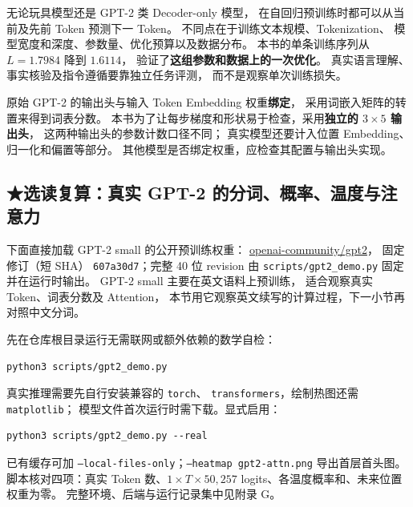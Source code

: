 无论玩具模型还是 GPT-2 类 Decoder-only 模型，
在自回归预训练时都可以从当前及先前 Token 预测下一 Token。
不同点在于训练文本规模、Tokenization、
模型宽度和深度、参数量、优化预算以及数据分布。
本书的单条训练序列从 $L=1.7984$ 降到 $1.6114$，
验证了\textbf{这组参数和数据上的一次优化}。
真实语言理解、事实核验及指令遵循要靠独立任务评测，
而不是观察单次训练损失。

原始 GPT-2 的输出头与输入 Token Embedding 权重\textbf{绑定}，
采用词嵌入矩阵的转置来得到词表分数。
本书为了让每步梯度和形状易于检查，采用\textbf{独立的 $3\times5$ 输出头}，
这两种输出头的参数计数口径不同；
真实模型还要计入位置 Embedding、归一化和偏置等部分。
其他模型是否绑定权重，应检查其配置与输出头实现。

\subsection{\texorpdfstring{{\symboliconfont ★}}{★}选读复算：真实 GPT-2 的分词、概率、温度与注意力}

下面直接加载 GPT-2 small 的公开预训练权重：
\href{https://huggingface.co/openai-community/gpt2}{openai-community/gpt2}，
固定修订（短 SHA）
\texttt{607a30d7}；完整 40 位 revision
由 \texttt{scripts/gpt2\_demo.py} 固定并在运行时输出。
GPT-2 small 主要在英文语料上预训练，
适合观察真实 Token、词表分数及 Attention，
本节用它观察英文续写的计算过程，下一小节再对照中文分词。

先在仓库根目录运行无需联网或额外依赖的数学自检：
\begin{verbatim}
python3 scripts/gpt2_demo.py
\end{verbatim}
真实推理需要先自行安装兼容的 \texttt{torch}、
\texttt{transformers}，绘制热图还需 \texttt{matplotlib}；
模型文件首次运行时需下载。显式启用：
\begin{verbatim}
python3 scripts/gpt2_demo.py --real
\end{verbatim}
已有缓存可加 \texttt{--local-files-only}；\texttt{--heatmap gpt2-attn.png} 导出首层首头图。
脚本核对四项：真实 Token 数、$1\times T\times50{,}257$ logits、各温度概率和、未来位置权重为零。
完整环境、后端与运行记录集中见附录 G。

